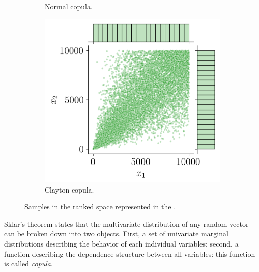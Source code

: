 \begin{figure}
\begin{subfigure}[b]{0.32\textwidth}
        \caption{Normal copula.}
    \end{subfigure}
    \hfill
    \begin{subfigure}[b]{0.32\textwidth}
        \centering
        \includegraphics[width=\textwidth]{../numerical_experiments/chapter1/figures/clayton_copula_ranked.png}
        \caption{Clayton copula.}
    \end{subfigure}
       \caption{Samples in the ranked space represented in the .}
       \label{fig:ranked_joint_dist_samples}
\end{figure}

Sklar's theorem \citep{sklar_1959} states that the multivariate distribution of any random vector can be broken down into two objects. 
First, a set of univariate marginal distributions describing the behavior of each individual variables; 
second, a function describing the dependence structure between all variables: this function is called \textit{copula}. 


